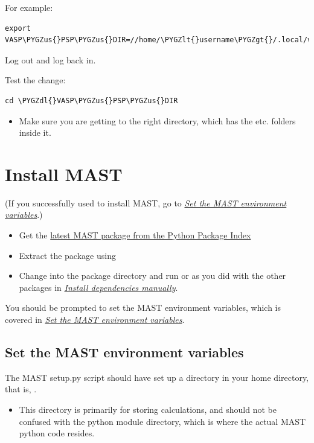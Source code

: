 \documentclass[letterpaper,10pt,english]{sphinxmanual}
\def\PYGZus{\char`\_}
\def\PYGZlt{\char`\<}
\def\PYGZgt{\char`\>}
\def\PYGZdl{\char`\$}
\begin{document}
For example:

\begin{Verbatim}[commandchars=\\\{\}]
export VASP\PYGZus{}PSP\PYGZus{}DIR=//home/\PYGZlt{}username\PYGZgt{}/.local/vasp\PYGZus{}pps
\end{Verbatim}

Log out and log back in.

Test the change:

\begin{Verbatim}[commandchars=\\\{\}]
cd \PYGZdl{}VASP\PYGZus{}PSP\PYGZus{}DIR
\end{Verbatim}
\begin{itemize}
\item {} 
Make sure you are getting to the right directory, which has the  etc. folders inside it.

\end{itemize}


\section{Install MAST}
\label{1_0_installation:id2}\label{1_0_installation:install-mast}
(If you successfully used  to install MAST, go to {\hyperref[1_0_installation:mast-setup]{\emph{Set the MAST environment variables}}}.)
\begin{itemize}
\item {} 
Get the \href{https://pypi.python.org/pypi/MAST}{latest MAST package from the Python Package Index}

\item {} 
Extract the package using 

\item {} 
Change into the package directory and run  or  as you did with the other packages in {\hyperref[1_0_installation:manual-installation]{\emph{Install dependencies manually}}}.

\end{itemize}

You should be prompted to set the MAST environment variables, which is covered in {\hyperref[1_0_installation:mast-setup]{\emph{Set the MAST environment variables}}}.


\subsection{Set the MAST environment variables}
\label{1_0_installation:mast-setup}\label{1_0_installation:set-the-mast-environment-variables}
The MAST setup.py script should have set up a  directory in your home directory, that is, .
\begin{itemize}
\item {} 
This directory is primarily for storing calculations, and should not be confused with the python module directory, which is where the actual MAST python code resides.

\end{itemize}
\end{document}
